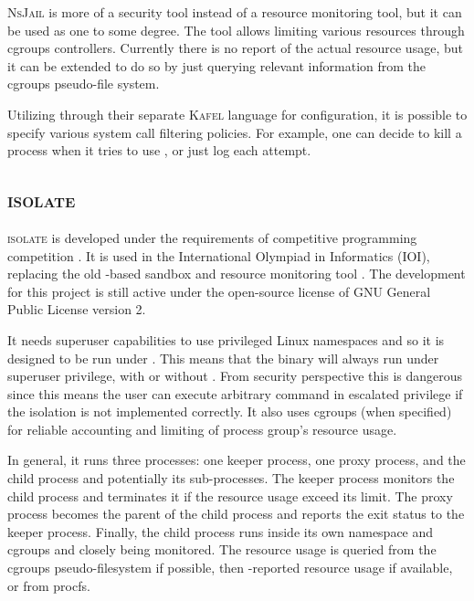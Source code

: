 \textsc{NsJail} is more of a security tool instead of a resource monitoring tool, but it can be used as one to some degree.
The tool allows limiting various resources through cgroups controllers.
Currently there is no report of the actual resource usage, but it can be extended to do so by just querying relevant information from the cgroups pseudo-file system.

Utilizing  through their separate \textsc{Kafel} \citep{LanguageLibrarySpecifying2019} language for configuration, it is possible to specify various system call filtering policies.
For example, one can decide to kill a process when it tries to use , or just log each attempt.


\subsection{\textsc{isolate}}

\textsc{isolate} \citep{SandboxSecurelyExecuting2019} is developed under the requirements of competitive programming competition \citep{marevs2012new}.
It is used in the International Olympiad in Informatics (IOI), replacing the old -based sandbox and resource monitoring tool \citep{maggioloCMSGrowingGrading2014}.
The development for this project is still active under the open-source license of GNU General Public License version 2.

It needs superuser capabilities to use privileged Linux namespaces and so it is designed to be run under .
This means that the binary will always run under superuser privilege, with or without .
From security perspective this is dangerous since this means the user can execute arbitrary command in escalated privilege if the isolation is not implemented correctly.
It also uses cgroups (when specified) for reliable accounting and limiting of process group's resource usage.

In general, it runs three processes: one keeper process, one proxy process, and the child process and potentially its sub-processes.
The keeper process monitors the child process and terminates it if the resource usage exceed its limit.
The proxy process becomes the parent of the child process and reports the exit status to the keeper process.
Finally, the child process runs inside its own namespace and cgroups and closely being monitored.
The resource usage is queried from the cgroups pseudo-filesystem if possible, then -reported resource usage if available, or from procfs.


